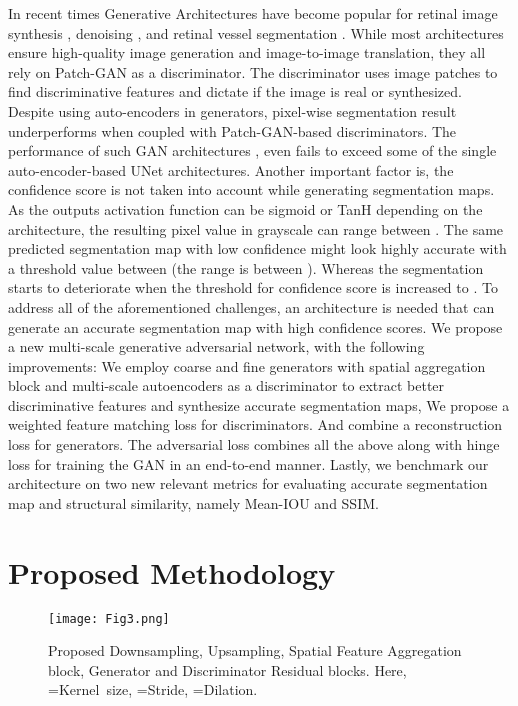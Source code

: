 \documentclass[runningheads]{llncs}
\begin{document}
In recent times Generative Architectures have become popular for retinal image synthesis \cite{kamran2020attention2angiogan,kamran2020fundus2angio}, denoising \cite{chen2020dn,dong2020optical}, and retinal vessel segmentation \cite{son2017retinal,yang2020sud}. While most architectures ensure high-quality image generation and image-to-image translation, they all rely on Patch-GAN \cite{isola2017image} as a discriminator. The discriminator uses image patches to find discriminative features and dictate if the image is real or synthesized. Despite using auto-encoders in generators, pixel-wise segmentation result underperforms when coupled with Patch-GAN-based discriminators. The performance of such GAN architectures \cite{son2017retinal,park2020m,yang2020sud}, even fails to exceed some of the single auto-encoder-based UNet architectures\cite{jin2019dunet,li2020iternet}. Another important factor is, the confidence score is not taken into account while generating segmentation maps. As the outputs activation function can be sigmoid  or TanH  depending on the architecture, the resulting pixel value in grayscale can range between . The same predicted segmentation map with low confidence might look highly accurate with a threshold value between  (the range is between ). Whereas the segmentation starts to deteriorate when the threshold for confidence score is increased to . To address all of the aforementioned challenges, an architecture is needed that can generate an accurate segmentation map with high confidence scores. 
We propose a new multi-scale generative adversarial network, with the following improvements:  We employ coarse and fine generators with spatial aggregation block and multi-scale autoencoders as a discriminator to extract better discriminative features and synthesize accurate segmentation maps,  We propose a weighted feature matching loss for discriminators. And combine a reconstruction loss for generators. The adversarial loss combines all the above along with hinge loss for training the GAN in an end-to-end manner.  Lastly, we benchmark our architecture on two new relevant metrics for evaluating accurate segmentation map and structural similarity, namely Mean-IOU and SSIM. 
\fi
\section{Proposed Methodology}
\begin{figure}[t]
    \centering
    \texttt{[image: Fig3.png]}
    \caption{Proposed Downsampling, Upsampling, Spatial Feature Aggregation block, Generator and Discriminator Residual blocks. Here, =Kernel\ size, =Stride, =Dilation. }
    \label{fig3}
\end{figure}
\end{document}
